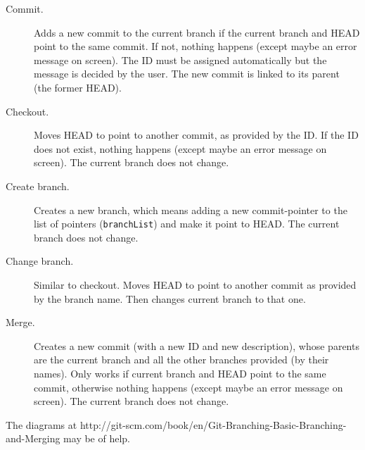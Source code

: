 \documentclass{article}
\begin{document}
\begin{description}
\item[Commit. ] Adds a new commit to the current branch if the current
  branch and HEAD point to the same commit. If not, nothing happens
  (except maybe an error message on screen). 
  The ID must be assigned automatically but the message is decided by
  the user.  
  The new commit is linked to its parent (the former HEAD). 
\item[Checkout. ] Moves HEAD to point to another commit, as provided
  by the ID. If the ID does not exist, nothing happens
  (except maybe an error message on screen). 
  The current branch does not change. 
\item[Create branch. ] Creates a new branch, which means adding a new
  commit-pointer to the list of pointers (\verb+branchList+) and 
  make it point to HEAD. 
  The current branch does not change. 
\item[Change branch. ] Similar to checkout. Moves HEAD to point to
  another commit as provided by the branch name. Then changes current
  branch to that one. 
\item[Merge. ] Creates a new commit (with a new ID and new
  description), whose parents are the current branch and all the other
  branches provided (by their names). Only works if current branch and
  HEAD point to the same commit, otherwise nothing happens
  (except maybe an error message on screen). 
  The current branch does not change. 
\end{description}

The diagrams at
http://git-scm.com/book/en/Git-Branching-Basic-Branching-and-Merging
may be of help. 
\end{document}
